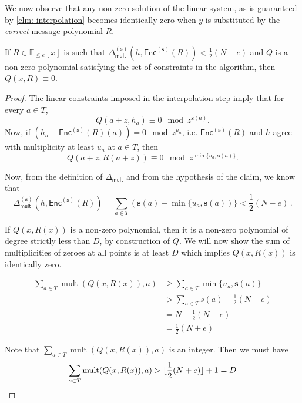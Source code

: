 \documentclass{theoretics}
\def\Field{\mathbb{F}}
\let\F\Field
\newcommand{\enc}{{\mathsf{Enc}}}
\newcommand{\mult}{\operatorname{mult}}
\newcommand{\Delm}{\Delta_{\mathsf{mult}}}
\newcommand{\sbar}{\mathbf{s}}
\begin{document}
	We now observe that any non-zero solution of the linear system, as is
	guaranteed by \autoref{clm: interpolation} becomes identically zero when
	$y$ is substituted by the \emph{correct} message polynomial $R$.
	
	\begin{claim}\label{clm: close enough poly staisfy eqn}
		If $R \in \F_{\leq e}[x]$ is such that $\Delm^{(\sbar)}(h,\enc^{(\sbar)}(R)) < \frac{1}{2}(N - e)$ and $Q$ is a non-zero polynomial satisfying the set of constraints in the algorithm, then $Q(x, R) \equiv 0$.
	\end{claim}
	
	\begin{proof}
		The linear constraints imposed in the interpolation step imply that for every $a \in T$, \[ Q(a + z, h_a) \equiv 0 \mod z^{\sbar(a)}. \]
		Now, if $(h_a - \enc^{(\sbar)}(R)(a)) = 0 \mod z^{u_a}$, i.e. $\enc^{(\sbar)}(R)$ and $h$ agree with multiplicity at least $u_a$ at $a \in T$, then 
		\[ 
		Q(a + z, R(a + z)) \equiv 0 \mod z^{\min\{u_a, \sbar(a)\}}. 
		\]
		
		Now, from the definition of $\Delm$ and from the hypothesis of the claim, we know that
		\[
		\Delm^{(\sbar)}(h,\enc^{(\sbar)}(R)) = \sum_{a \in T} (\sbar(a) - \min\{u_a, \sbar(a))\} < \frac{1}{2}(N-e)\, .
		\]
		
		If $Q(x, R(x))$ is a non-zero polynomial, then it is a non-zero polynomial of degree strictly less than $D$, by construction of $Q$. We will now show the sum of multiplicities of zeroes at all points is at least $D$ which implies $Q(x, R(x))$ is identically zero.
		
		\[
		\begin{split}
			\sum_{a \in T} \mult(Q(x, R(x)), a) & \geq \sum_{a \in T} \min\{u_a, \sbar(a)\} \\
			& > \sum_{a \in T} s(a) - \frac{1}{2} (N-e) \\
			& = N - \frac{1}{2} (N-e) \\
			& = \frac{1}{2}(N+e)
		\end{split}
		\]
		
		Note that $\sum_{a \in T} \mult(Q(x, R(x)), a)$ is an integer. Then we must have 
		\[ \sum_{a \in T} \mult(Q(x, R(x)), a) > \lfloor \frac{1}{2}(N+e) \rfloor +1 = D \qedhere \]
	\end{proof}
	
\end{document}
